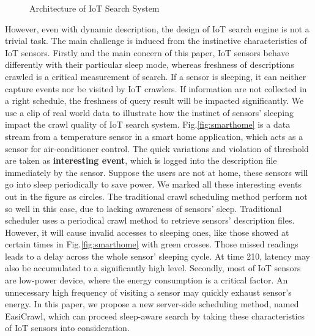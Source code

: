 \documentclass[conference]{IEEEtran}
\begin{document}
\begin{figure}
	\vspace{0.5em}
	\centering
	\hspace{-3.0em}
	
	\captionsetup{justification=centering}
	\caption{Architecture of IoT Search System}
	\vspace{-1.0em}
	\label{fig:architecture}
\end{figure}

However, even with dynamic description, the design of IoT search engine is not a trivial task. 
The main challenge is induced from the instinctive characteristics of IoT sensors. 
Firstly and the main concern of this paper, IoT sensors behave differently with their particular sleep mode, whereas freshness of descriptions crawled is a critical measurement of search. 
If a sensor is sleeping, it can neither capture events nor be visited by IoT crawlers. 
If information are not collected in a right schedule, the freshness of query result will be impacted significantly.
We use a clip of real world data to illustrate how the instinct of sensors' sleeping impact the crawl quality of IoT search system.
Fig.\ref{fig:smarthome} is a data stream from a temperature sensor in a smart home application, which acts as a sensor for air-conditioner control. 
The quick variations and violation of threshold are taken as \textbf{interesting event}, which is logged into the description file immediately by the sensor.
Suppose the users are not at home, these sensors will go into sleep periodically to save power.
We marked all these interesting events out in the figure as circles.
The traditional crawl scheduling method perform not so well in this case, due to lacking awareness of sensors' sleep. 
Traditional scheduler uses a periodical crawl method to retrieve sensors' description files.
However, it will cause invalid accesses to sleeping ones, like those showed at certain times in Fig.\ref{fig:smarthome} with green crosses. 
Those missed readings leads to a delay across the whole sensor' sleeping cycle. 
At time 210, latency may also be accumulated to a significantly high level. 
Secondly, most of IoT sensors are low-power device, where the energy consumption is a critical factor. 
An unnecessary high frequency of visiting a sensor may quickly exhaust sensor's energy.
In this paper, we propose a new server-side scheduling method, named EasiCrawl, which can proceed sleep-aware search by taking these characteristics of IoT sensors into consideration.
\end{document}
